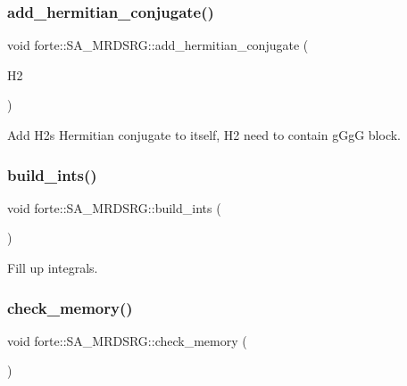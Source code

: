 \subsubsection{\texorpdfstring{add\+\_\+hermitian\+\_\+conjugate()}{add\_hermitian\_conjugate()}}
{\footnotesize\ttfamily void forte\+::\+S\+A\+\_\+\+M\+R\+D\+S\+R\+G\+::add\+\_\+hermitian\+\_\+conjugate (\begin{DoxyParamCaption}\item[{Blocked\+Tensor \&}]{H2 }\end{DoxyParamCaption})\hspace{0.3cm}{\ttfamily [protected]}}



Add H2\textquotesingle{}s Hermitian conjugate to itself, H2 need to contain g\+GgG block. 

\mbox{\label{classforte_1_1_s_a___m_r_d_s_r_g_aa5abe34ba442283a14582ae5cff4a076}} 
\subsubsection{\texorpdfstring{build\+\_\+ints()}{build\_ints()}}
{\footnotesize\ttfamily void forte\+::\+S\+A\+\_\+\+M\+R\+D\+S\+R\+G\+::build\+\_\+ints (\begin{DoxyParamCaption}{ }\end{DoxyParamCaption})\hspace{0.3cm}{\ttfamily [protected]}}



Fill up integrals. 

\mbox{\label{classforte_1_1_s_a___m_r_d_s_r_g_ad093a045c517aa183cfe36a6886caeb6}} 
\subsubsection{\texorpdfstring{check\+\_\+memory()}{check\_memory()}}
{\footnotesize\ttfamily void forte\+::\+S\+A\+\_\+\+M\+R\+D\+S\+R\+G\+::check\+\_\+memory (\begin{DoxyParamCaption}{ }\end{DoxyParamCaption})\hspace{0.3cm}{\ttfamily [protected]}}



